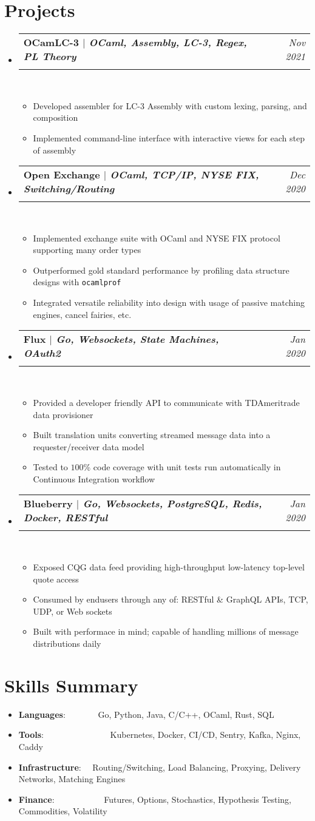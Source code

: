 \documentclass[a4paper,11pt]{extarticle}
\makeatletter
\newcommand{\resumeSkillItem}[2]{
	\item\small{
		\textbf{#1}{: #2 \vspace{-2pt}}
	}
}
\newcommand{\resumeItem}[1]{
	\item\small{
		#1 \vspace{-2pt}
	}
}
\newcommand{\resumeSubheading}[4]{
	\vspace{-1pt}\item
		\begin{tabular*}{1\linewidth}{l@{\extracolsep{\fill}}r}
			\textbf{#1} & #2 \\
			\textit{#3} & \textit{#4} \\
		\end{tabular*}\vspace{-3pt}
}
\newcommand{\resumeSubItem}[2]{\resumeSkillItem{#1}{#2}\vspace{-5pt}}
\newcommand{\resumeSubHeadingListStart}{\begin{itemize}[leftmargin=0.15in,label={}]}
\newcommand{\resumeSubHeadingListEnd}{\end{itemize}}
\newcommand{\resumeItemListStart}{\begin{itemize}\vspace{-3pt}}
\newcommand{\resumeItemListEnd}{\end{itemize}\vspace{-3pt}}
\makeatother
\begin{document}
\section{Projects}
	\resumeSubHeadingListStart
		\resumeSubheading{OCamLC-3 $|$ 
		{\normalfont \small \textit 
		{OCaml, Assembly, LC-3, Regex, PL Theory}}}
		{\textit{Nov 2021}}{}{}\\[-12pt]
		\resumeItemListStart
			\resumeItem{Developed assembler for LC-3 Assembly with custom
			lexing, parsing, and composition}
			\resumeItem{Implemented command-line interface with interactive
			views for each step of assembly}
		\resumeItemListEnd
		\resumeSubheading{Open Exchange $|$ 
		{\normalfont \small \textit 
		{OCaml, TCP/IP, NYSE FIX, Switching/Routing}}}
		{\textit{Dec 2020}}{}{}\\[-12pt]
		\resumeItemListStart
			\resumeItem{Implemented exchange suite with OCaml and NYSE
				FIX protocol supporting many order types}
			\resumeItem{Outperformed gold standard performance by profiling
				data structure designs with \texttt{ocamlprof}}
			\resumeItem{Integrated versatile reliability into design with 
				usage of passive matching engines, cancel fairies, etc.}
		\resumeItemListEnd
		\resumeSubheading{Flux $|$ 
		{\normalfont \small \textit 
		{Go, Websockets, State Machines, OAuth2}}}
		{\textit{Jan 2020}}{}{}\\[-12pt]
		\resumeItemListStart
			\resumeItem{Provided a developer friendly API to communicate with
				TDAmeritrade data provisioner}
			\resumeItem{Built translation units converting streamed message
				data into a requester/receiver data model}
			\resumeItem{Tested to $100$\% code coverage with unit tests 
				run automatically in Continuous Integration workflow}
		\resumeItemListEnd
		\resumeSubheading{Blueberry $|$ 
		{\normalfont \small \textit 
		{Go, Websockets, PostgreSQL, Redis, Docker, RESTful}}}
		{\textit{Jan 2020}}{}{}\\[-12pt]
		\resumeItemListStart
			\resumeItem{Exposed CQG data feed providing high-throughput
			low-latency top-level quote access}
			\resumeItem{Consumed by endusers through any of:
			RESTful \& GraphQL APIs, TCP, UDP, or Web sockets}
			\resumeItem{Built with performace in mind; capable of handling
			millions of message distributions daily}
		\resumeItemListEnd
	\resumeSubHeadingListEnd

\section{Skills Summary}
	\resumeSubHeadingListStart
		\resumeSubItem{Languages}
			{\hspace{0.6mm}~~~~~~~Go, Python, Java, C/C++, OCaml, Rust, SQL}
		\resumeSubItem{Tools}
			{\hspace{0.3mm}~~~~~~~~~~~~~~~Kubernetes, Docker, CI/CD, Sentry,
				Kafka, Nginx, Caddy}
		\resumeSubItem{Infrastructure}
			{~~Routing/Switching, Load Balancing, Proxying, Delivery Networks,
			 Matching Engines}
		\resumeSubItem{Finance}
			{\hspace{0.7mm}~~~~~~~~~~~Futures, Options, Stochastics, Hypothesis
				Testing, Commodities, Volatility}
	\resumeSubHeadingListEnd
\end{document}
